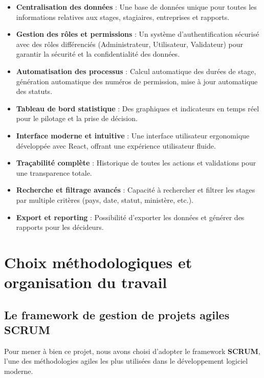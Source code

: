 \documentclass[12pt,a4paper]{report}
\begin{document}
\begin{itemize}[leftmargin=1cm]
    \item \textbf{Centralisation des données} : Une base de données unique pour toutes les informations relatives aux stages, stagiaires, entreprises et rapports.
    
    \item \textbf{Gestion des rôles et permissions} : Un système d'authentification sécurisé avec des rôles différenciés (Administrateur, Utilisateur, Validateur) pour garantir la sécurité et la confidentialité des données.
    
    \item \textbf{Automatisation des processus} : Calcul automatique des durées de stage, génération automatique des numéros de permission, mise à jour automatique des statuts.
    
    \item \textbf{Tableau de bord statistique} : Des graphiques et indicateurs en temps réel pour le pilotage et la prise de décision.
    
    \item \textbf{Interface moderne et intuitive} : Une interface utilisateur ergonomique développée avec React, offrant une expérience utilisateur fluide.
    
    \item \textbf{Traçabilité complète} : Historique de toutes les actions et validations pour une transparence totale.
    
    \item \textbf{Recherche et filtrage avancés} : Capacité à rechercher et filtrer les stages par multiple critères (pays, date, statut, ministère, etc.).
    
    \item \textbf{Export et reporting} : Possibilité d'exporter les données et générer des rapports pour les décideurs.
\end{itemize}

\section{Choix méthodologiques et organisation du travail}

\subsection{Le framework de gestion de projets agiles SCRUM}

Pour mener à bien ce projet, nous avons choisi d'adopter le framework \textbf{SCRUM}, l'une des méthodologies agiles les plus utilisées dans le développement logiciel moderne.
\end{document}
